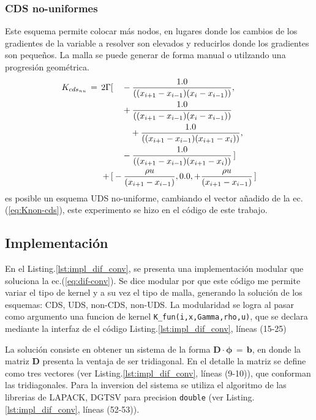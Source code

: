 \documentclass[9pt,technote,twoside,letterpaper,onecolumn]{IEEEtran}
\begin{document}
\begin{multicols}{2}
\subsubsection{CDS no-uniformes}
\label{sec:cds-non-u}
Este esquema permite colocar más nodos, en lugares donde los cambios de los gradientes de la variable a resolver son elevados y reducirlos donde los gradientes son pequeños. La malla se puede generar de forma manual o utilzando una progresión geométrica.
\begin{align}
  K_{cds_{nu}}\,=\,2\Gamma[&\quad -\frac{1.0}{((x_{i+1}-x_{i-1})(x_i-x_{i-1}))}, \notag\\
         &\quad +\frac{1.0}{((x_{i+1}-x_{i-1})(x_i-x_{i-1}))} \notag\\
         &\qquad+ \frac{1.0}{((x_{i+1}-x_{i-1})(x_{i+1}-x_i))}, \label{eq:Knon-cds}\\
         &\quad -\frac{1.0}{((x_{i+1}-x_{i-1})(x_{i+1}-x_i))}\,] \notag\\
  +\,[&-\frac{\rho u}{(x_{i+1}-x_{i-1})}, 0.0, +\frac{\rho u}{(x_{i+1}-x_{i-1})}\,]\notag
\end{align}
es posible un esquema UDS no-uniforme, cambiando el vector añadido de la ec.(\ref{eq:Knon-cds}), este experimento se hizo en el código de este trabajo.

\subsection{Implementación}
\label{sec:imp_sol_dif_conv}

En el Listing.\ref{lst:impl_dif_conv}, se presenta una implementación modular que soluciona la ec.(\ref{eq:dif-conv}). Se dice modular por que este código me permite variar el tipo de kernel y a su vez el tipo de malla, generando la solución de los esquemas: CDS, UDS, non-CDS, non-UDS. La modularidad se logra al pasar como argumento una funcion de kernel \verb.K_fun(i,x,Gamma,rho,u)., que se declara mediante la interfaz de el código Listing.\ref{lst:impl_dif_conv}, líneas (15-25)

La solución consiste en obtener un sistema de la forma $\mathbf{D}\cdot\mathbf{\phi}\,=\,\mathbf{b}$, en donde la matriz $\mathbf{D}$ presenta la ventaja de ser tridiagonal. En el detalle la matriz se define como tres vectores (ver Listing.\ref{lst:impl_dif_conv}, líneas (9-10)), que conforman las tridiagonales. Para la inversion del sistema se utiliza el algoritmo de las librerias de LAPACK, DGTSV para precision \verb.double. (ver Listing.\ref{lst:impl_dif_conv}, líneas (52-53)). 


\end{multicols}
\end{document}
